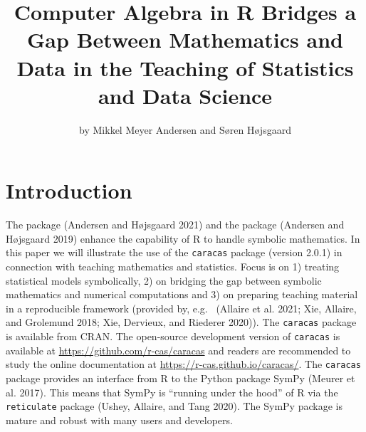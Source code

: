 \title{Computer Algebra in R Bridges a Gap Between Mathematics and Data in the Teaching of Statistics and Data Science}
\author{by Mikkel Meyer Andersen and Søren Højsgaard}

\maketitle


\hypertarget{introduction}{%
\section{Introduction}\label{introduction}}

The  package (Andersen and Højsgaard 2021) and the 
package (Andersen and Højsgaard 2019) enhance the capability of R to handle
symbolic mathematics. In this paper we will illustrate the use of the
\texttt{caracas} package (version 2.0.1) in connection with teaching mathematics and
statistics. Focus is on 1) treating statistical models symbolically,
2) on bridging the gap between symbolic mathematics and numerical
computations and 3) on preparing teaching material in a reproducible
framework (provided by, e.g.~ (Allaire et al. 2021; Xie, Allaire, and Grolemund 2018; Xie, Dervieux, and Riederer 2020)). The \texttt{caracas} package
is available from CRAN. The open-source development version of
\texttt{caracas} is available at \url{https://github.com/r-cas/caracas} and
readers are recommended to study the online documentation at
\url{https://r-cas.github.io/caracas/}. The \texttt{caracas} package provides an
interface from R to the Python package SymPy (Meurer et al. 2017). This
means that SymPy is ``running under the hood'' of R via the
\texttt{reticulate} package (Ushey, Allaire, and Tang 2020). The SymPy package is mature and
robust with many users and developers.

